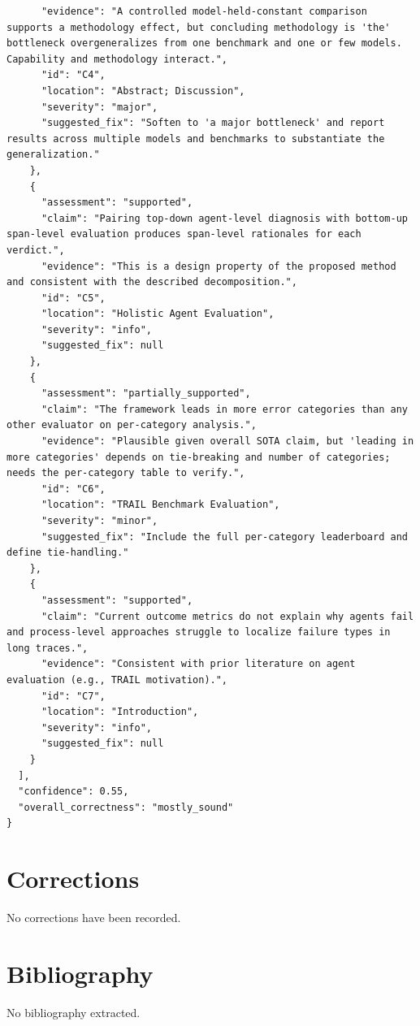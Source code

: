 \documentclass[11pt]{article}
\begin{document}
\begin{verbatim}
      "evidence": "A controlled model-held-constant comparison supports a methodology effect, but concluding methodology is 'the' bottleneck overgeneralizes from one benchmark and one or few models. Capability and methodology interact.",
      "id": "C4",
      "location": "Abstract; Discussion",
      "severity": "major",
      "suggested_fix": "Soften to 'a major bottleneck' and report results across multiple models and benchmarks to substantiate the generalization."
    },
    {
      "assessment": "supported",
      "claim": "Pairing top-down agent-level diagnosis with bottom-up span-level evaluation produces span-level rationales for each verdict.",
      "evidence": "This is a design property of the proposed method and consistent with the described decomposition.",
      "id": "C5",
      "location": "Holistic Agent Evaluation",
      "severity": "info",
      "suggested_fix": null
    },
    {
      "assessment": "partially_supported",
      "claim": "The framework leads in more error categories than any other evaluator on per-category analysis.",
      "evidence": "Plausible given overall SOTA claim, but 'leading in more categories' depends on tie-breaking and number of categories; needs the per-category table to verify.",
      "id": "C6",
      "location": "TRAIL Benchmark Evaluation",
      "severity": "minor",
      "suggested_fix": "Include the full per-category leaderboard and define tie-handling."
    },
    {
      "assessment": "supported",
      "claim": "Current outcome metrics do not explain why agents fail and process-level approaches struggle to localize failure types in long traces.",
      "evidence": "Consistent with prior literature on agent evaluation (e.g., TRAIL motivation).",
      "id": "C7",
      "location": "Introduction",
      "severity": "info",
      "suggested_fix": null
    }
  ],
  "confidence": 0.55,
  "overall_correctness": "mostly_sound"
}
\end{verbatim}

\section*{Corrections}
No corrections have been recorded.

\section*{Bibliography}
No bibliography extracted.

% 
% 
\end{document}
